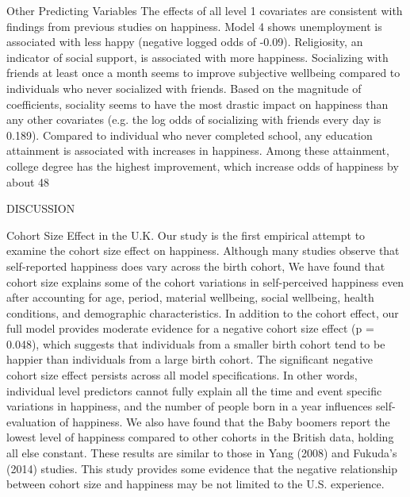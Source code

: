 Other Predicting Variables
	The effects of all level 1 covariates are consistent with findings from previous studies on happiness. Model 4 shows unemployment is associated with less happy (negative logged odds of -0.09). Religiosity, an indicator of social support, is associated with more happiness. Socializing with friends at least once a month seems to improve subjective wellbeing compared to individuals who never socialized with friends. Based on the magnitude of coefficients, sociality seems to have the most drastic impact on happiness than any other covariates (e.g. the log odds of socializing with friends every day is 0.189). Compared to individual who never completed school, any education attainment is associated with increases in happiness. Among these attainment, college degree has the highest improvement, which increase odds of happiness by about 48%


DISCUSSION

Cohort Size Effect in the U.K.
Our study is the first empirical attempt to examine the cohort size effect on happiness. Although many studies observe that self-reported happiness does vary across the birth cohort, We have found that cohort size explains some of the cohort variations in self-perceived happiness even after accounting for age, period, material wellbeing, social wellbeing, health conditions, and demographic characteristics. In addition to the cohort effect, our full model provides moderate evidence for a negative cohort size effect (p = 0.048), which suggests that individuals from a smaller birth cohort tend to be happier than individuals from a large birth cohort. The significant negative cohort size effect persists across all model specifications. In other words, individual level predictors cannot fully explain all the time and event specific variations in happiness, and the number of people born in a year influences self-evaluation of happiness. We also have found that the Baby boomers report the lowest level of happiness compared to other cohorts in the British data, holding all else constant. These results are similar to those in Yang (2008) and Fukuda’s (2014) studies. This study provides some evidence that the negative relationship between cohort size and happiness may be not limited to the U.S. experience. 

